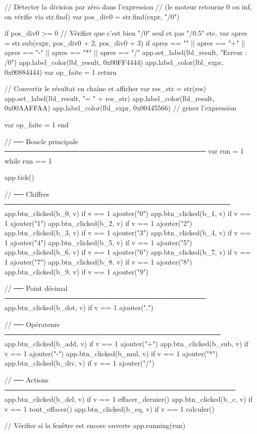     // Détecter la division par zéro dans l'expression
    // (le moteur retourne 0 ou inf, on vérifie via str.find)
    var pos_div0 = str.find(expr, "/0")

    if pos_div0 >= 0 {
        // Vérifier que c'est bien "/0" seul et pas "/0.5" etc.
        var apres = str.sub(expr, pos_div0 + 2, pos_div0 + 3)
        if apres == "" || apres == "+" || apres == "-" || apres == "*" || apres == "/" {
            app.set_label(lbl_result, "Erreur : /0")
            app.label_color(lbl_result, 0x00FF4444)
            app.label_color(lbl_expr,   0x00884444)
            var op_faite = 1
            return
        }
    }

    // Convertir le résultat en chaîne et afficher
    var res_str = str(res)
    app.set_label(lbl_result, "= " + res_str)
    app.label_color(lbl_result, 0x00AAFFAA)
    app.label_color(lbl_expr,   0x00445566)   // griser l'expression

    var op_faite = 1
end

// ── Boucle principale ─────────────────────────────────────────
var run = 1
while run == 1 {
    app.tick()

    // ── Chiffres ──────────────────────────────────────────────
    app.btn_clicked(b_0, v) if v == 1 { ajouter("0") }
    app.btn_clicked(b_1, v) if v == 1 { ajouter("1") }
    app.btn_clicked(b_2, v) if v == 1 { ajouter("2") }
    app.btn_clicked(b_3, v) if v == 1 { ajouter("3") }
    app.btn_clicked(b_4, v) if v == 1 { ajouter("4") }
    app.btn_clicked(b_5, v) if v == 1 { ajouter("5") }
    app.btn_clicked(b_6, v) if v == 1 { ajouter("6") }
    app.btn_clicked(b_7, v) if v == 1 { ajouter("7") }
    app.btn_clicked(b_8, v) if v == 1 { ajouter("8") }
    app.btn_clicked(b_9, v) if v == 1 { ajouter("9") }

    // ── Point décimal ─────────────────────────────────────────
    app.btn_clicked(b_dot, v) if v == 1 { ajouter(".") }

    // ── Opérateurs ────────────────────────────────────────────
    app.btn_clicked(b_add, v) if v == 1 { ajouter("+") }
    app.btn_clicked(b_sub, v) if v == 1 { ajouter("-") }
    app.btn_clicked(b_mul, v) if v == 1 { ajouter("*") }
    app.btn_clicked(b_div, v) if v == 1 { ajouter("/") }

    // ── Actions ───────────────────────────────────────────────
    app.btn_clicked(b_del, v) if v == 1 { effacer_dernier() }
    app.btn_clicked(b_c,   v) if v == 1 { tout_effacer()    }
    app.btn_clicked(b_eq,  v) if v == 1 { calculer()        }

    // Vérifier si la fenêtre est encore ouverte
    app.running(run)
}
